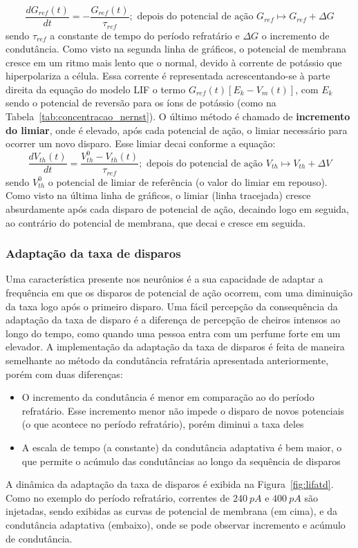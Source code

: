 \begin{equation}\label{eq:condutancia_refrataria}
	\frac{dG_{ref}(t)}{dt} = -\frac{G_{ref}(t)}{\tau_{ref}};\text{ depois do potencial de ação } G_{ref} \mapsto G_{ref} + \Delta G
\end{equation}
sendo $\tau_{ref}$ a constante de tempo do período refratário e $\Delta G$ o incremento de condutância. Como visto na segunda linha de gráficos, o potencial de membrana cresce em um ritmo mais lento que o normal, devido à corrente de potássio que hiperpolariza a célula. Essa corrente é representada acrescentando-se à parte direita da equação do modelo LIF o termo $G_{ref}(t)[E_k-V_m(t)]$, com $E_k$ sendo o potencial de reversão para os íons de potássio (como na Tabela~\ref{tab:concentracao_nernst}). O último método é chamado de \textbf{incremento do limiar}, onde é elevado, após cada potencial de ação, o limiar necessário para ocorrer um novo disparo. Esse limiar decai conforme a equação:
\begin{equation}\label{eq:incremento_limiar}
	\frac{dV_{th}(t)}{dt} = \frac{V^0_{th}-V_{th}(t)}{\tau_{ref}};\text{ depois do potencial de ação } V_{th} \mapsto V_{th} + \Delta V
\end{equation}
sendo $V^0_{th}$ o potencial de limiar de referência (o valor do limiar em repouso). Como visto na última linha de gráficos, o limiar (linha tracejada) cresce absurdamente após cada disparo de potencial de ação, decaindo logo em seguida, ao contrário do potencial de membrana, que decai e cresce em seguida. 

\subsubsection{Adaptação da taxa de disparos}
Uma característica presente nos neurônios é a sua capacidade de adaptar a frequência em que os disparos de potencial de ação ocorrem, com uma diminuição da taxa logo após o primeiro disparo. Uma fácil percepção da consequência da adaptação da taxa de disparo é a diferença de percepção de cheiros intensos ao longo do tempo, como quando uma pessoa entra com um perfume forte em um elevador. A implementação da adaptação da taxa de disparos é feita de maneira semelhante ao método da condutância refratária apresentada anteriormente, porém com duas diferenças:
\begin{itemize}
	\item O incremento da condutância é menor em comparação ao do período refratário. Esse incremento menor não impede o disparo de novos potenciais (o que acontece no período refratário), porém diminui a taxa deles
	\item A escala de tempo (a constante) da condutância adaptativa é bem maior, o que permite o acúmulo das condutâncias ao longo da sequência de disparos
\end{itemize}
A dinâmica da adaptação da taxa de disparos é exibida na Figura~\ref{fig:lifatd}. Como no exemplo do período refratário, correntes de $240\ pA$ e $400\ pA$ são injetadas, sendo exibidas as curvas de potencial de membrana (em cima), e da condutância adaptativa (embaixo), onde se pode observar incremento e acúmulo de condutância.

